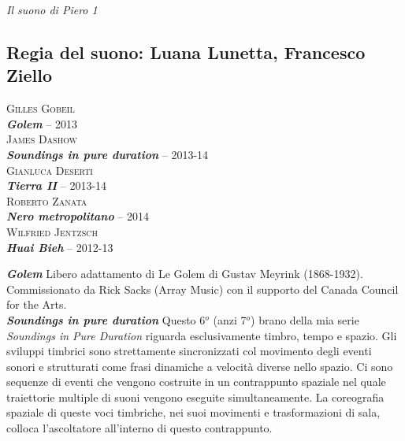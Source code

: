 \documentclass[9pt, twoside, a5paper]{extreport}
\newcommand{\descrizione}[2]{%
\noindent \textbf{\textit{#1}} %
#2 %
\\
}%
\newcommand{\acusmatico}[3]{%
\noindent \textsc{#1}\\ %
\noindent \textbf{\textit{#2}} -- #3%
\\
}%
\begin{document}
{\fontsize{30}{30}\selectfont \textit{Il suono di Piero 1}}

\subsection*{\textsf{Regia del suono: Luana Lunetta, Francesco Ziello}}

\bigskip

\begin{multicols}{2}

\acusmatico{Gilles Gobeil}
{Golem}{2013}


\acusmatico{James Dashow}
{Soundings in pure duration}{2013-14}


\acusmatico{Gianluca Deserti}
{Tierra II}{2013-14}


\acusmatico{Roberto Zanata}
{Nero metropolitano}{2014}


\acusmatico{Wilfried Jentzsch}
{Huai Bieh}{2012-13}

\vspace{7cm}


%
%

\bigskip

\descrizione{Golem}{Libero adattamento di Le Golem di Gustav Meyrink (1868-1932). Commissionato da Rick Sacks (Array Music) con il supporto del Canada Council for the Arts.}


\descrizione{Soundings in pure duration}{Questo 6$^o$ (anzi 7$^o$) brano della mia serie \textit{Soundings in Pure Duration} riguarda esclusivamente timbro, tempo e spazio. Gli sviluppi timbrici sono strettamente sincronizzati col movimento degli eventi sonori e strutturati come frasi dinamiche a velocità diverse nello spazio. Ci sono sequenze di eventi che vengono costruite in un contrappunto spaziale nel quale traiettorie multiple di suoni vengono eseguite simultaneamente. La coreografia spaziale di queste voci timbriche, nei suoi movimenti e trasformazioni di sala, colloca l'ascoltatore all'interno di questo contrappunto.}



\end{multicols}
\end{document}
